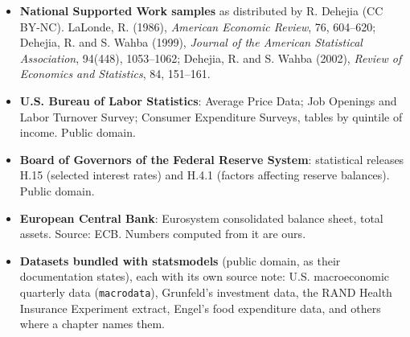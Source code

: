 \begin{itemize}
  2022-05. Licence Ouverte / Etalab 2.0.
\item \textbf{National Supported Work samples} as distributed by R. Dehejia
  (CC BY-NC). LaLonde, R. (1986), \textit{American Economic Review}, 76,
  604--620; Dehejia, R. and S. Wahba (1999), \textit{Journal of the American
  Statistical Association}, 94(448), 1053--1062; Dehejia, R. and S. Wahba
  (2002), \textit{Review of Economics and Statistics}, 84, 151--161.
\item \textbf{U.S. Bureau of Labor Statistics}: Average Price Data; Job Openings and
  Labor Turnover Survey; Consumer Expenditure Surveys, tables by quintile of income. Public domain.
\item \textbf{Board of Governors of the Federal Reserve System}: statistical releases H.15
  (selected interest rates) and H.4.1 (factors affecting reserve balances). Public domain.
\item \textbf{European Central Bank}: Eurosystem consolidated balance sheet, total assets.
  Source: ECB. Numbers computed from it are ours.
\item \textbf{Datasets bundled with statsmodels} (public domain, as their
  documentation states), each with its own source note: U.S. macroeconomic
  quarterly data (\texttt{macrodata}), Grunfeld's investment data, the RAND
  Health Insurance Experiment extract, Engel's food expenditure data, and others
  where a chapter names them.
\end{itemize}
